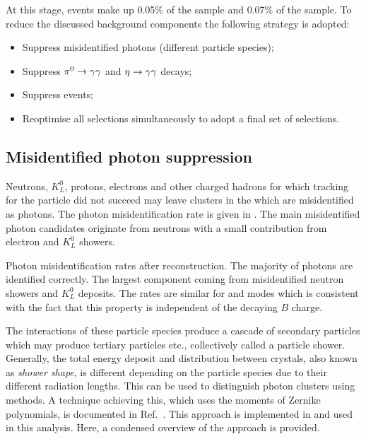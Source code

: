 At this stage, \BtoXsgamma events make up 0.05\% of the \feiBp sample and 0.07\% of the \feiBz sample.
To reduce the discussed background components the following strategy is adopted:
\begin{itemize}
    \item Suppress misidentified photons (different particle species);
    \item Suppress $\pi^0\rightarrow\gamma\gamma$ and $\eta\rightarrow\gamma\gamma$ decays;
    \item Suppress \epem\ra\qqbar events;
    \item Reoptimise all selections simultaneously to adopt a final set of selections.
\end{itemize}

\subsection{Misidentified photon suppression}\label{sec:selection_clusZMVA}

Neutrons, $K_L^0$, protons, electrons and other charged hadrons for which tracking for the particle did not succeed may leave clusters in the \ECL which are misidentified as photons.
The photon misidentification rate is given in .
The main misidentified photon candidates originate from neutrons with a small contribution from electron and $K_L^0$ showers.

\begin{table}[htbp!]
    \centering
    \caption{\label{tab:misidentified_photons} Photon misidentification rates after reconstruction.
    The majority of photons are identified correctly. The largest component coming from misidentified neutron showers and $K_L^0$ deposits.
    The rates are similar for \feiBp and \feiBz modes which is consistent with the fact that this property is independent of the decaying $B$ charge.}
    
\end{table}

The interactions of these particle species produce a cascade of secondary particles which may produce tertiary particles etc., collectively called a particle shower.
Generally, the total energy deposit and distribution between \ECL crystals, also known as \textit{shower shape}, is different depending on the particle species due to their different radiation lengths.
This can be used to distinguish photon clusters using \MVA methods.
A technique achieving this, which uses the moments of Zernike polynomials, is documented in Ref.~\cite{Hershenhorn:2468}.
This approach is implemented in \basftwo and used in this analysis.
Here, a condensed overview of the approach is provided.

